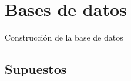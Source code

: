 \chapter{Bases de datos}

\noindent Construcción de la base de datos

\newpage

\section{Supuestos}

